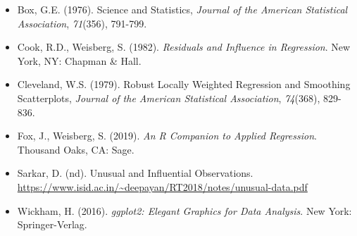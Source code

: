 \documentclass[]{article}
\begin{document}
\begin{itemize}
\item
  Box, G.E. (1976). Science and Statistics, \emph{Journal of the
  American Statistical Association}, \emph{71}(356), 791-799.
\item
  Cook, R.D., Weisberg, S. (1982). \emph{Residuals and Influence in
  Regression}. New York, NY: Chapman \& Hall.
\item
  Cleveland, W.S. (1979). Robust Locally Weighted Regression and
  Smoothing Scatterplots, \emph{Journal of the American Statistical
  Association}, \emph{74}(368), 829-836.
\item
  Fox, J., Weisberg, S. (2019). \emph{An R Companion to Applied
  Regression}. Thousand Oaks, CA: Sage.
\item
  Sarkar, D. (nd). Unusual and Influential Observations.
  \url{https://www.isid.ac.in/~deepayan/RT2018/notes/unusual-data.pdf}
\item
  Wickham, H. (2016). \emph{ggplot2: Elegant Graphics for Data
  Analysis}. New York: Springer-Verlag.
\end{itemize}
\end{document}
